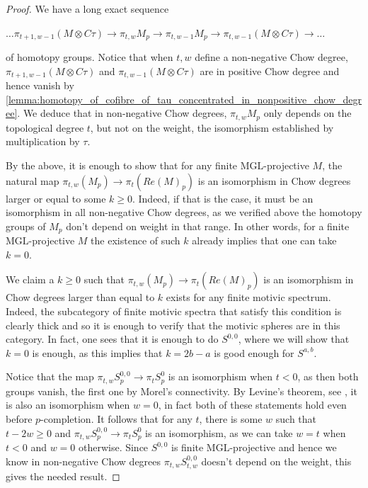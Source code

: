 \documentclass[oneside,a4paper]{amsart}
\newcommand{\MGL}{\mathrm{MGL}} %
\theoremstyle{plain}
\theoremstyle{definition}
\theoremstyle{remark}
\begin{document}
\begin{proof}
We have a long exact sequence

\begin{center}
$\ldots \pi_{t+1, w-1} (M \otimes C \tau) \rightarrow \pi_{t, w} M_{p} \rightarrow \pi_{t, w-1} M_{p} \rightarrow \pi_{t, w-1} (M \otimes C\tau) \rightarrow \ldots$
\end{center}
of homotopy groups. Notice that when $t, w$ define a non-negative Chow degree, $\pi_{t+1, w-1} (M \otimes C \tau)$ and $\pi_{t, w-1} (M \otimes C\tau)$ are in positive Chow degree and hence vanish by \cref{lemma:homotopy_of_cofibre_of_tau_concentrated_in_nonpositive_chow_degree}. We deduce that in non-negative Chow degrees, $\pi_{t, w} M_{p}$ only depends on the topological degree $t$, but not on the weight, the isomorphism established by multiplication by $\tau$.

By the above, it is enough to show that for any finite $\MGL$-projective $M$, the natural map $\pi_{t, w}(M_{p}) \rightarrow \pi_{t}(Re(M)_{p})$ is an isomorphism in Chow degrees larger or equal to some $k \geq 0$. Indeed, if that is the case, it must be an isomorphism in all non-negative Chow degrees, as we verified above the homotopy groups of $M_{p}$ don't depend on weight in that range. In other words, for a finite $\MGL$-projective $M$ the existence of such $k$ already implies that one can take $k = 0$. 

We claim a $k \geq 0$ such that $\pi_{t, w}(M_{p}) \rightarrow \pi_{t}(Re(M)_{p})$ is an isomorphism in Chow degrees larger than equal to $k$ exists for any finite motivic spectrum. Indeed, the subcategory of finite motivic spectra that satisfy this condition is clearly thick and so it is enough to verify that the motivic spheres are in this category. In fact, one sees that it is enough to do $S^{0, 0}$, where we will show that $k = 0$ is enough, as this implies that $k = 2b - a$ is good enough for $S^{a, b}$.  

Notice that the map $\pi_{t, w} S^{0, 0}_{p} \rightarrow \pi_{t} S^{0}_{p}$ is an isomorphism when $t < 0 $, as then both groups vanish, the first one by Morel's connectivity. By Levine's theorem, see \cite{levine2014comparison}, it is also an isomorphism when $w = 0$, in fact both of these statements hold even before $p$-completion. It follows that for any $t$, there is some $w$ such that $t - 2w \geq 0$ and $\pi_{t, w} S^{0, 0}_{p} \rightarrow \pi_{t} S^{0}_{p}$ is an isomorphism, as we can take $w = t$ when $t  < 0$ and $w = 0$ otherwise. Since $S^{0, 0}$ is finite $\MGL$-projective and hence we know in non-negative Chow degrees $\pi_{t, w} S^{0,0}_{t, w}$ doesn't depend on the weight, this gives the needed result. 
\end{proof}
\end{document}

